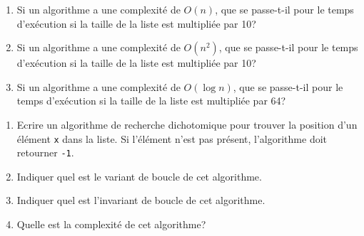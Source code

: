 \documentclass[11pt, a4paper]{report}
\begin{document}
\def\level{Premiere}  %
\def\course{NSI}
\def\chaptername{Les algorithmes de recherche} %
\def\docname{AP06~--~TD 1}        %

\pagestyle{DS_LP}

\NomPrenom{}

\begin{exercice_cours}{}
    
    \begin{enumerate}
        \item Si un algorithme a une complexité de $O(n)$, que se passe-t-il pour le temps d'exécution si la taille de la liste est multipliée par 10? \hfill
        \item Si un algorithme a une complexité de $O(n^2)$, que se passe-t-il pour le temps d'exécution si la taille de la liste est multipliée par 10? \hfill
        \item Si un algorithme a une complexité de $O(\log n)$, que se passe-t-il pour le temps d'exécution si la taille de la liste est multipliée par 64? \hfill
    \end{enumerate}   
\end{exercice_cours}

\begin{exercice_cours}
    
    \begin{enumerate}
        \item     Ecrire un algorithme de recherche dichotomique pour trouver la position d'un élément \verb|x| dans la liste. Si l'élément n'est pas présent, l'algorithme doit retourner \verb|-1|.


\item Indiquer quel est le variant de boucle de cet algorithme. \hfill{}
    \item Indiquer quel est l'invariant de boucle de cet algorithme. \hfill
    
    \item Quelle est la complexité de cet algorithme? \hfill{}  


    \end{enumerate}

\end{exercice_cours}
\end{document}
